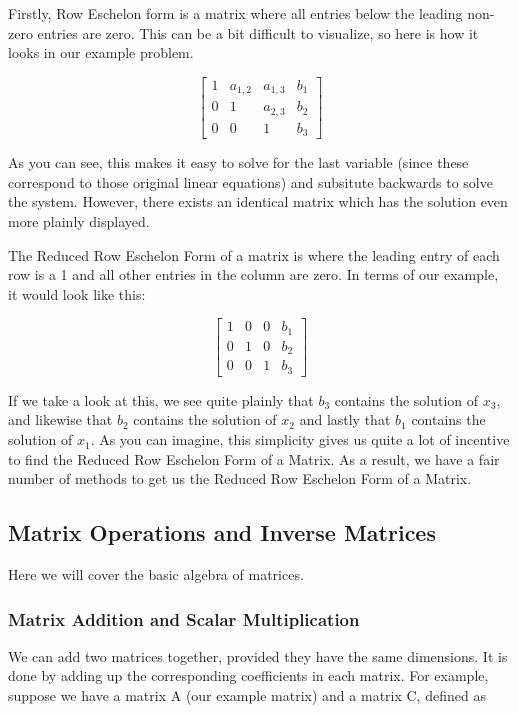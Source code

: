 Firstly, Row Eschelon form is a matrix where all entries below the leading non-zero entries are zero. This can be a bit difficult to visualize, so here is how it looks in our example problem.

$$
\begin{bmatrix}
1&a_{1,2}&a_{1,3}&b_{1}\\
0&1&a_{2,3}&b_{2}\\ 
0&0&1&b_{3}
\end{bmatrix}
$$

As you can see, this makes it easy to solve for the last variable (since these correspond to those original linear equations) and subsitute backwards to solve the system. However, there exists an identical matrix which has the solution even more plainly displayed.

The Reduced Row Eschelon Form of a matrix is where the leading entry of each row is a 1 and all other entries in the column are zero. In terms of our example, it would look like this:

$$
\begin{bmatrix}
1&0&0&b_{1}\\
0&1&0&b_{2}\\ 
0&0&1&b_{3}
\end{bmatrix}
$$

If we take a look at this, we see quite plainly that $b_{3}$ contains the solution of $x_{3}$, and likewise that $b_{2}$ contains the solution of $x_{2}$ and lastly that $b_{1}$ contains the solution of $x_{1}$. As you can imagine, this simplicity gives us quite a lot of incentive to find the Reduced Row Eschelon Form of a Matrix. As a result, we have a fair number of methods to get us the Reduced Row Eschelon Form of a Matrix.

\subsection{Matrix Operations and Inverse Matrices}

Here we will cover the basic algebra of matrices.

\subsubsection{Matrix Addition and Scalar Multiplication}

We can add two matrices together, provided they have the same dimensions. 
It is done by adding up the corresponding coefficients in each matrix.
For example, suppose we have a matrix A (our example matrix) and a matrix C, defined as

